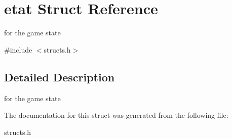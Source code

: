 \hypertarget{structetat}{}\section{etat Struct Reference}
\label{structetat}


for the game state  




{\ttfamily \#include $<$structs.\+h$>$}



\subsection{Detailed Description}
for the game state 

The documentation for this struct was generated from the following file\+:\begin{DoxyCompactItemize}
\item 
structs.\+h\end{DoxyCompactItemize}
